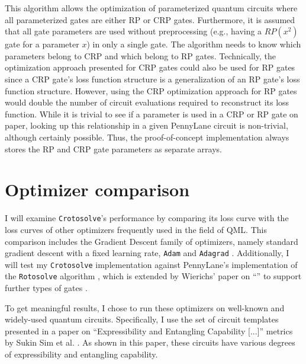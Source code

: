 This algorithm allows the optimization of parameterized quantum circuits where
all parameterized gates are either RP or CRP gates.
Furthermore, it is assumed that all gate parameters are used without
preprocessing (e.g., having a $RP(x^2)$ gate for a parameter $x$) in only a
single gate.
The algorithm needs to know which parameters belong to CRP and which belong to
RP gates.
Technically, the optimization approach presented for CRP gates could also be
used for RP gates since a CRP gate's loss function structure is a generalization
of an RP gate's loss function structure.
However, using the CRP optimization approach for RP gates would double the
number of circuit evaluations required to reconstruct its loss function.
While it is trivial to see if a parameter is used in a CRP or RP gate on paper,
looking up this relationship in a given PennyLane circuit is non-trivial,
although certainly possible.
Thus, the proof-of-concept implementation always stores the RP and CRP gate
parameters as separate arrays.

\section{Optimizer comparison}
\label{sec:optimizer-comparison}

I will examine \texttt{Crotosolve}'s performance by comparing its loss curve
with the loss curves of other optimizers frequently used in the field of QML.
This comparison includes the Gradient Descent family of optimizers, namely
standard gradient descent with a fixed learning rate, %
\texttt{Adam} \cite{kingma_adam_2017} and
\texttt{Adagrad} \cite{duchi_adaptive_2011}.
Additionally, I will test my \texttt{Crotosolve} implementation against
PennyLane's implementation of the \texttt{Rotosolve} algorithm
\cite{ostaszewski_structure_2021,bergholm_pennylane_2018}, which is extended by
Wierichs' paper on ``\emph{}'' to
support further types of gates \cite{wierichs_general_2022}.

To get meaningful results, I chose to run these optimizers on well-known and
widely-used quantum circuits.
Specifically, I use the set of circuit templates presented in a paper on
``Expressibility and Entangling Capability [...]'' metrics by Sukin Sim et al.
\cite{sim_expressibility_2019}.
As shown in this paper, these circuits have various degrees of expressibility
and entangling capability. %

